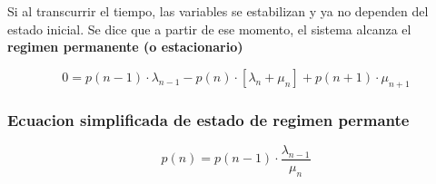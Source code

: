 \documentclass{article}
\begin{document}
Si al transcurrir el tiempo, las variables se estabilizan y ya no dependen del estado inicial. Se dice que
a partir de ese momento, el sistema alcanza el \textbf{regimen permanente (o estacionario)}

\begin{equation}
    0 = p(n-1) \cdot \lambda_{n-1} - p(n) \cdot [\lambda_n + \mu_n] + p(n+1) \cdot \mu_{n+1}
\end{equation}


\subsubsection{Ecuacion simplificada de estado de regimen permante}

\begin{equation}
    p(n)= p(n-1) \cdot \frac{ \lambda_{n-1}}{\mu_n}
\end{equation}



\newpage
\end{document}
